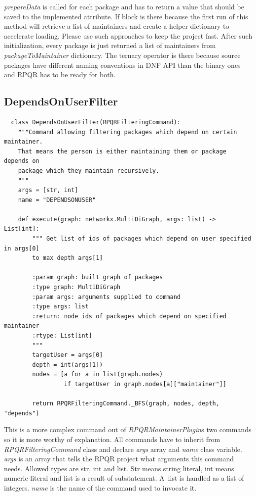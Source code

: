 \textit{prepareData} is called for each package and has to return a value that should be
saved to the implemented attribute. If block is there because the first run of this method will retrieve
a list of maintainers and create a helper dictionary to accelerate loading. Please use such approaches
to keep the project fast. After such initialization, every package is just returned a list of maintainers
from \textit{packageToMaintainer} dictionary. The ternary operator is there because source packages
have different naming conventions in DNF API than the binary ones and RPQR has to be ready for both.

\newpage

\subsection*{DependsOnUserFilter}

\begin{lstlisting}
  class DependsOnUserFilter(RPQRFilteringCommand):
    """Command allowing filtering packages which depend on certain maintainer.
    That means the person is either maintaining them or package depends on
    package which they maintain recursively.
    """
    args = [str, int]
    name = "DEPENDSONUSER"

    def execute(graph: networkx.MultiDiGraph, args: list) -> List[int]:
        """ Get list of ids of packages which depend on user specified in args[0]
        to max depth args[1]

        :param graph: built graph of packages
        :type graph: MultiDiGraph
        :param args: arguments supplied to command
        :type args: list
        :return: node ids of packages which depend on specified maintainer
        :rtype: List[int]
        """
        targetUser = args[0]
        depth = int(args[1])
        nodes = [a for a in list(graph.nodes)
                 if targetUser in graph.nodes[a]["maintainer"]]

        return RPQRFilteringCommand._BFS(graph, nodes, depth, "depends")
\end{lstlisting}

This is a more complex command out of \textit{RPQRMaintainerPlugin}s two commands so it is more worthy of
explanation. All commands have to inherit from \textit{RPQRFilteringCommand} class and declare \textit{args}
array and \textit{name} class variable. \textit{args} is an array that tells the RPQR project what arguments
this command needs. Allowed types are str, int and list. Str means string literal, int means numeric
literal and list is a result of substatement. A~list is handled as a list of integers. \textit{name}
is the name of the command used to invocate it.

